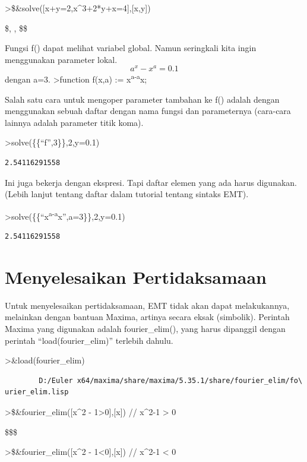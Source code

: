 \documentclass[
]{book}
\begin{document}
\textgreater\$\&solve({[}x+y=2,x\^{}3+2*y+x=4{]},{[}x,y{]})

\$\left[ \left[ x=-1 , y=3 \right]  , \left[ x=1 , y=1 \right]  , \left[ x=0 , y=2 \right]  \right{]} \$\$

Fungsi f() dapat melihat variabel global. Namun seringkali kita ingin menggunakan parameter lokal. \[a^x-x^a = 0.1\]dengan a=3. \textgreater function f(x,a) := x\textsuperscript{a-a}x;

Salah satu cara untuk mengoper parameter tambahan ke f() adalah dengan menggunakan sebuah daftar dengan nama fungsi dan parameternya (cara-cara lainnya adalah parameter titik koma).

\textgreater solve(\{\{``f'',3\}\},2,y=0.1)

\begin{verbatim}
2.54116291558
\end{verbatim}

Ini juga bekerja dengan ekspresi. Tapi daftar elemen yang ada harus digunakan. (Lebih lanjut tentang daftar dalam tutorial tentang sintaks EMT).

\textgreater solve(\{\{``x\textsuperscript{a-a}x'',a=3\}\},2,y=0.1)

\begin{verbatim}
2.54116291558
\end{verbatim}

\section{Menyelesaikan Pertidaksamaan}\label{menyelesaikan-pertidaksamaan}

Untuk menyelesaikan pertidaksamaan, EMT tidak akan dapat melakukannya, melainkan dengan bantuan Maxima, artinya secara eksak (simbolik). Perintah Maxima yang digunakan adalah fourier\_elim(), yang harus dipanggil dengan perintah ``load(fourier\_elim)'' terlebih dahulu.

\textgreater\&load(fourier\_elim)

\begin{verbatim}
        D:/Euler x64/maxima/share/maxima/5.35.1/share/fourier_elim/fo\
urier_elim.lisp
\end{verbatim}

\textgreater\$\&fourier\_elim({[}x\^{}2 - 1\textgreater0{]},{[}x{]}) // x\^{}2-1 \textgreater{} 0

\$\left[ 1<x \right] \lor \left[ x<-1 \right] \$\$

\textgreater\$\&fourier\_elim({[}x\^{}2 - 1\textless0{]},{[}x{]}) // x\^{}2-1 \textless{} 0
\end{document}
